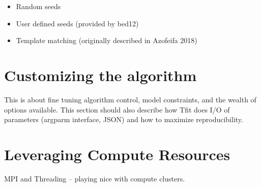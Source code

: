 \documentclass[11pt]{article}
\begin{document}
\begin{itemize}
\item Random seeds
\item User defined seeds (provided by bed12)
\item Template matching (originally described in Azofeifa 2018)
\end{itemize}

\section{Customizing the algorithm}
This is about fine tuning algorithm control, model constraints, and 
the wealth of options available.   This section should also describe 
how Tfit does I/O of parameters (argparm interface, JSON) and how
to maximize reproducibility. 

\section{Leveraging Compute Resources}
MPI and Threading -- playing nice with compute clusters.

\small{
  
  {}
}
\end{document}
